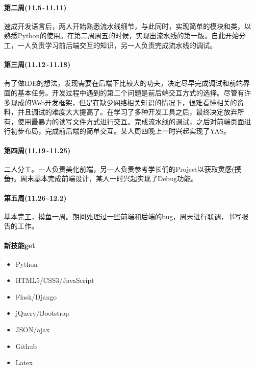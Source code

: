 \documentclass[12pt]{article} %
\begin{document}
\begin{sloppypar}
\paragraph{第二周(11.5\~{}11.11)}

速成开发语言后，两人开始熟悉流水线细节，与此同时，实现简单的模块和类，以熟悉Python的使用。在第二周周五的时候，实现出流水线的第一版。自此开始分工，一人负责学习前后端交互的知识，另一人负责完成流水线的调试。

\paragraph{第三周(11.12\~{}11.18)}

有了做IDE的想法，发现需要在后端下比较大的功夫，决定尽早完成调试和前端界面的基本任务。开发过程中遇到的第二个问题是前后端交互方式的选择。尽管有许多现成的Web开发框架，但是在缺少网络相关知识的情况下，很难看懂相关的资料，并且调试的难度大大提高了。在学习了多种开发工具之后，最终决定放弃所有，使用最暴力的读写文件方式进行交互。完成流水线的调试，之后对前端页面进行初步布局，完成前后端的简单交互。某人周四晚上一时兴起实现了YAS。

\paragraph{第四周(11.19\~{}11.25)}

二人分工。一人负责美化前端，另一人负责参考学长们的Project以获取灵感\sout{(摸鱼)}。周末基本完成前端设计，某人一时兴起实现了Debug功能。

\paragraph{第五周(11.26\~{}12.2)}

基本完工，摸鱼一周。期间处理过一些前端和后端的bug，周末进行联调，书写报告的工作。

\paragraph{新技能get}
\begin{itemize}
\item Python
\item HTML5/CSS3/JavaScript
\item Flask/Django
\item jQuery/Bootstrap
\item JSON/ajax
\item Github
\item Latex
\end{itemize}


\end{sloppypar}
\end{document}
